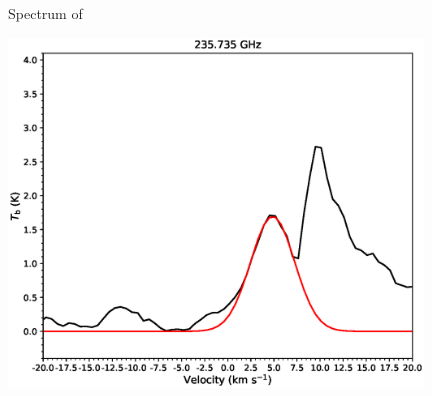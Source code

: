 \begin{figure}[H]
\begin{center}
\begin{minipage}{0.98\textwidth}
\begin{center}
\begin{minipage}{0.48\textwidth}
\begin{center}
\end{center}
\end{minipage}
\end{center}
\end{minipage}

\caption{Spectrum of}
\end{center}
\end{figure}

\begin{figure}[H] 
\begin{center}
\begin{minipage}{0.98\textwidth} 
\begin{center}
\begin{minipage}{0.48\textwidth}
\begin{center}
\includegraphics[width=0.98\textwidth]{OrionKL/spectrum/HC/235.735037w_fit.eps}
\end{center}
\end{minipage}
\begin{minipage}{0.48\textwidth}
\begin{center}

\end{center}
\end{minipage}
\end{center}
\end{minipage}
\end{center}
\end{figure}

